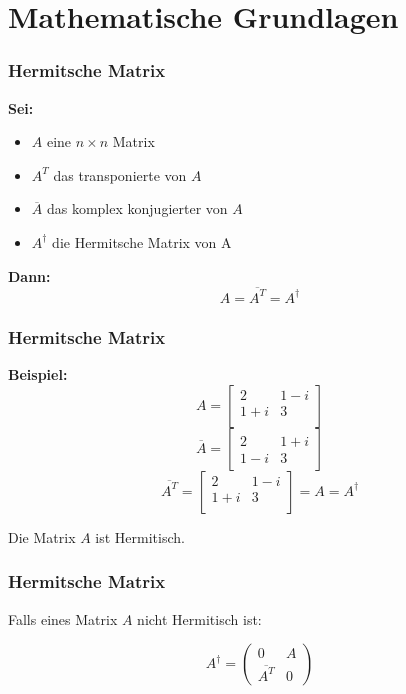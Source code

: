 \section{Mathematische Grundlagen}

\begin{frame}
    \frametitle{Hermitsche Matrix}
    \textbf{Sei: }
    \begin{itemize}
        \item   $A$ eine $n \times n$ Matrix
        \item   $A^T$ das transponierte von $A$
        \item   $\overline A$  das komplex konjugierter von $A$
        \item   $A^\dagger$ die Hermitsche Matrix von A
   \end{itemize}

   \hfil

    \textbf{Dann:}
    $$A = \overline {A^T} = A^\dagger $$
\end{frame}

\begin{frame}
    \frametitle{Hermitsche Matrix}
    
    \textbf{Beispiel:}
    $$A=\begin{bmatrix}2 & 1-i \\ 1+i & 3 \\ \end{bmatrix}$$
    $$\overline A = \begin{bmatrix} 2 & 1+i \\ 1-i & 3 \end{bmatrix}$$
    $$\overline {A^T} = \begin{bmatrix} 2 & 1-i \\ 1+i & 3 \\ \end{bmatrix}= A = A^\dagger$$

    \hfil

    \hfil

    Die Matrix $A$ ist Hermitisch.
\end{frame}

\begin{frame}
    \frametitle{Hermitsche Matrix}
    
    Falls eines Matrix $A$ nicht Hermitisch ist:

    \hfil

    $$A^\dagger = \begin{pmatrix} 0 & A \\ \overline {A^T} & 0 \end{pmatrix}$$
\end{frame}


